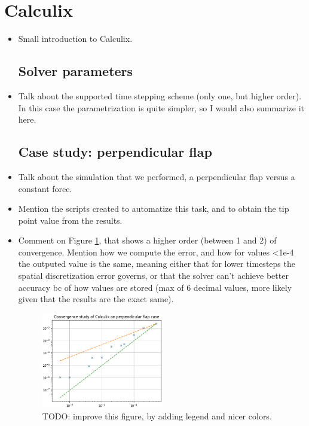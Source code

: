 \documentclass[
  english,        %
  font=times,     %
  onecolumn,      %
]{tumarticle}
\begin{document}
\section{Calculix}
\begin{itemize}
    \item Small introduction to Calculix.
    \subsection{Solver parameters}
    \item Talk about the supported time stepping scheme (only one, but higher order). In this case the parametrization is quite simpler, so I would also summarize it here.
    
    \subsection{Case study: perpendicular flap}
    \item Talk about the simulation that we performed, a perpendicular flap versus a constant force.
    \item Mention the scripts created to automatize this task, and to obtain the tip point value from the results.
    \item Comment on Figure \ref{fig:calculix_convergence}, that shows a higher order (between 1 and 2) of convergence. Mention how we compute the error, and how for values <1e-4 the outputed value is the same, meaning either that for lower timesteps the spatial discretization error governs, or that the solver can't achieve better accuracy bc of how values are stored (max of 6 decimal values, more likely given that the results are the exact same). 
    
    \begin{figure}
        \centering
        \includegraphics[width=0.5\textwidth]{resources/calculix_convergence_study.png}
        \caption{TODO: improve this figure, by adding legend and nicer colors.}
        \label{fig:calculix_convergence}
    \end{figure}

\end{itemize}
\end{document}
